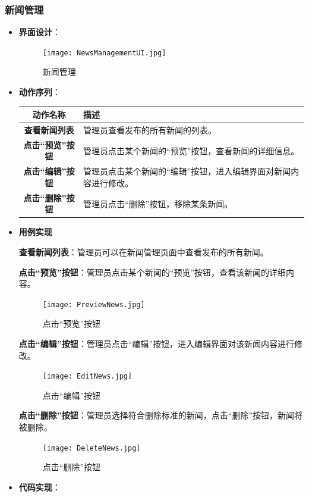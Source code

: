 \subsubsection{新闻管理}

\begin{itemize}
	\item \textbf{界面设计}：
	\begin{figure}[H]
		\centering
		\texttt{[image: NewsManagementUI.jpg]}
		\caption{新闻管理}
	\end{figure}
	\item \textbf{动作序列}：
	\begin{table}[H]
		\centering
		\renewcommand\arraystretch{1.5}
		\begin{tabular}{|c|>{\raggedright\arraybackslash}p{10cm}|}
			\hline
			\textbf{动作名称} & \textbf{描述} \\ \hline
			\textbf{查看新闻列表} & 管理员查看发布的所有新闻的列表。\\ \hline
			\textbf{点击“预览”按钮} & 管理员点击某个新闻的“预览”按钮，查看新闻的详细信息。\\ \hline
			\textbf{点击“编辑”按钮} & 管理员点击某个新闻的“编辑”按钮，进入编辑界面对新闻内容进行修改。\\ \hline
			\textbf{点击“删除”按钮} & 管理员点击“删除”按钮，移除某条新闻。\\ \hline
		\end{tabular}
	\end{table}
	
	\item \textbf{用例实现}
	
	\textbf{查看新闻列表}：管理员可以在新闻管理页面中查看发布的所有新闻。
	
	\textbf{点击“预览”按钮}：管理员点击某个新闻的“预览”按钮，查看该新闻的详细内容。
	
	\begin{figure}[H]
		\centering
		\texttt{[image: PreviewNews.jpg]}
		\caption{点击“预览”按钮}
	\end{figure}
	
	\textbf{点击“编辑”按钮}：管理员点击“编辑”按钮，进入编辑界面对该新闻内容进行修改。
	
	\begin{figure}[H]
		\centering
		\texttt{[image: EditNews.jpg]}
		\caption{点击“编辑”按钮}
	\end{figure}
	
	\textbf{点击“删除”按钮}：管理员选择符合删除标准的新闻，点击“删除”按钮，新闻将被删除。
	
	\begin{figure}[H]
		\centering
		\texttt{[image: DeleteNews.jpg]}
		\caption{点击“删除”按钮}
	\end{figure}
	
	\item \textbf{代码实现}：
	
\end{itemize}

